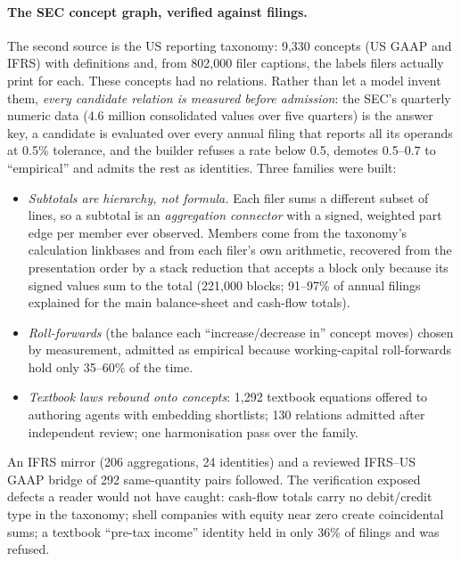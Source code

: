 \paragraph{The SEC concept graph, verified against filings.}
\label{sec:impl-secgraph}
The second source is the US reporting taxonomy: 9,330 concepts (US GAAP and IFRS) with definitions and, from 802,000 filer captions, the labels filers actually print for each. These concepts had no relations. Rather than let a model invent them, \emph{every candidate relation is measured before admission}: the SEC's quarterly numeric data (4.6 million consolidated values over five quarters) is the answer key, a candidate is evaluated over every annual filing that reports all its operands at 0.5\% tolerance, and the builder refuses a rate below 0.5, demotes 0.5--0.7 to ``empirical'' and admits the rest as identities. Three families were built:
\begin{itemize}
\item \emph{Subtotals are hierarchy, not formula.} Each filer sums a different subset of lines, so a subtotal is an \emph{aggregation connector} with a signed, weighted part edge per member ever observed. Members come from the taxonomy's calculation linkbases and from each filer's own arithmetic, recovered from the presentation order by a stack reduction that accepts a block only because its signed values sum to the total (221,000 blocks; 91--97\% of annual filings explained for the main balance-sheet and cash-flow totals).
\item \emph{Roll-forwards} (the balance each ``increase/decrease in'' concept moves) chosen by measurement, admitted as empirical because working-capital roll-forwards hold only 35--60\% of the time.
\item \emph{Textbook laws rebound onto concepts}: 1,292 textbook equations offered to authoring agents with embedding shortlists; 130 relations admitted after independent review; one harmonisation pass over the family.
\end{itemize}
An IFRS mirror (206 aggregations, 24 identities) and a reviewed IFRS--US GAAP bridge of 292 same-quantity pairs followed. The verification exposed defects a reader would not have caught: cash-flow totals carry no debit/credit type in the taxonomy; shell companies with equity near zero create coincidental sums; a textbook ``pre-tax income'' identity held in only 36\% of filings and was refused.

